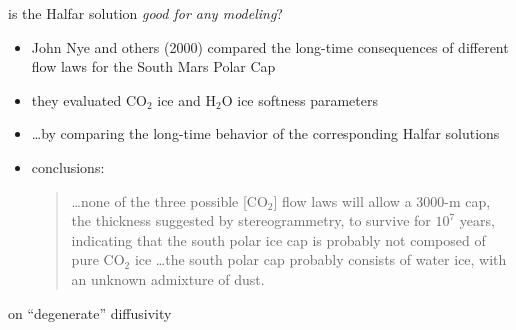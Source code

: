 \documentclass[titlepage,letterpaper,final,12pt]{scrartcl}
\newcommand{\grad}{\nabla}
\newcommand{\Div}{\nabla\cdot}
\begin{document}
is the Halfar solution \emph{good for any modeling}?

\begin{itemize}
\item John Nye and others (2000)\nocite{NyeIcarus2000} compared the long-time consequences of different flow laws for the South Mars Polar Cap
\item they evaluated $\text{CO}_2$ ice and $\text{H}_2\text{O}$ ice softness parameters
\item \dots by comparing the long-time behavior of the corresponding Halfar solutions
\item conclusions:
  \begin{quote}
  \dots none of the three possible [$\text{CO}_2$] flow laws will allow a 3000-m cap, the thickness suggested by stereogrammetry, to survive for $10^7$ years, indicating that the south polar ice cap is probably not composed of pure $\text{CO}_2$ ice \dots the south polar cap probably consists of water ice, with an unknown admixture of dust.
  \end{quote}
\end{itemize}

on ``degenerate'' diffusivity

\end{document}
